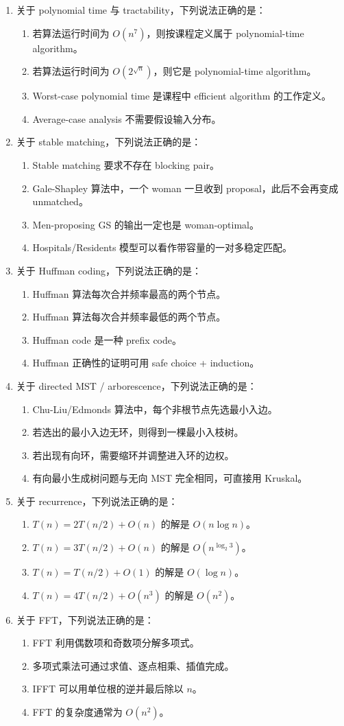 \documentclass[UTF8,a4paper,11pt]{ctexart}
\newcommand{\choice}[1]{\item[$\square$] #1}
\begin{document}
\begin{enumerate}
  \item 关于 polynomial time 与 tractability，下列说法正确的是：
  \begin{enumerate}
    \choice{若算法运行时间为 $O(n^7)$，则按课程定义属于 polynomial-time algorithm。}
    \choice{若算法运行时间为 $O(2^{\sqrt n})$，则它是 polynomial-time algorithm。}
    \choice{Worst-case polynomial time 是课程中 efficient algorithm 的工作定义。}
    \choice{Average-case analysis 不需要假设输入分布。}
  \end{enumerate}

  \item 关于 stable matching，下列说法正确的是：
  \begin{enumerate}
    \choice{Stable matching 要求不存在 blocking pair。}
    \choice{Gale-Shapley 算法中，一个 woman 一旦收到 proposal，此后不会再变成 unmatched。}
    \choice{Men-proposing GS 的输出一定也是 woman-optimal。}
    \choice{Hospitals/Residents 模型可以看作带容量的一对多稳定匹配。}
  \end{enumerate}

  \item 关于 Huffman coding，下列说法正确的是：
  \begin{enumerate}
    \choice{Huffman 算法每次合并频率最高的两个节点。}
    \choice{Huffman 算法每次合并频率最低的两个节点。}
    \choice{Huffman code 是一种 prefix code。}
    \choice{Huffman 正确性的证明可用 safe choice + induction。}
  \end{enumerate}

  \item 关于 directed MST / arborescence，下列说法正确的是：
  \begin{enumerate}
    \choice{Chu-Liu/Edmonds 算法中，每个非根节点先选最小入边。}
    \choice{若选出的最小入边无环，则得到一棵最小入枝树。}
    \choice{若出现有向环，需要缩环并调整进入环的边权。}
    \choice{有向最小生成树问题与无向 MST 完全相同，可直接用 Kruskal。}
  \end{enumerate}

  \item 关于 recurrence，下列说法正确的是：
  \begin{enumerate}
    \choice{$T(n)=2T(n/2)+O(n)$ 的解是 $O(n\log n)$。}
    \choice{$T(n)=3T(n/2)+O(n)$ 的解是 $O(n^{\log_2 3})$。}
    \choice{$T(n)=T(n/2)+O(1)$ 的解是 $O(\log n)$。}
    \choice{$T(n)=4T(n/2)+O(n^3)$ 的解是 $O(n^2)$。}
  \end{enumerate}

  \item 关于 FFT，下列说法正确的是：
  \begin{enumerate}
    \choice{FFT 利用偶数项和奇数项分解多项式。}
    \choice{多项式乘法可通过求值、逐点相乘、插值完成。}
    \choice{IFFT 可以用单位根的逆并最后除以 $n$。}
    \choice{FFT 的复杂度通常为 $O(n^2)$。}
  \end{enumerate}


\end{enumerate}
\end{document}
